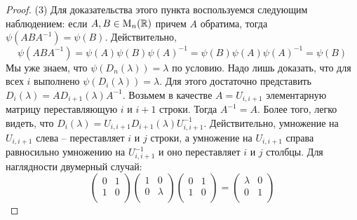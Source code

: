 \begin{proof}
(3) Для доказательства этого пункта воспользуемся следующим наблюдением: если $A,B\in\operatorname{M}_{n}(\mathbb R)$ причем $A$ обратима, тогда $\psi(ABA^{-1}) = \psi(B)$. Действительно, 
\[
\psi(ABA^{-1}) = \psi(A)\psi(B)\psi(A)^{-1} =  \psi(B)\psi(A)\psi(A)^{-1} = \psi(B)
\]
Мы уже знаем, что $\psi(D_n(\lambda)) = \lambda$ по условию. Надо лишь доказать, что для всех $i$ выполнено $\psi(D_i(\lambda)) = \lambda$. Для этого достаточно представить $D_{i}(\lambda) = A D_{i+1}(\lambda)A^{-1}$. Возьмем в качестве $A = U_{i, i+1}$ элементарную матрицу переставляющую $i$ и $i+1$ строки. Тогда $A^{-1} = A$. Более того, легко видеть, что $D_{i}(\lambda) = U_{i, i+1} D_{i+1}(\lambda)U_{i, i+1}^{-1}$. Действительно, умножение на $U_{i, i+1}$ слева -- переставляет $i$ и $j$ строки, а умножение на $U_{i, i+1}$ справа равносильно умножению на $U_{i, i+1}^{-1}$ и оно переставляет $i$ и $j$ столбцы. Для наглядности двумерный случай:
\[
\begin{pmatrix}
{0}&{1}\\
{1}&{0}\\
\end{pmatrix}
\begin{pmatrix}
{1}&{0}\\
{0}&{\lambda}\\
\end{pmatrix}
\begin{pmatrix}
{0}&{1}\\
{1}&{0}\\
\end{pmatrix}
=
\begin{pmatrix}
{\lambda}&{0}\\
{0}&{1}\\
\end{pmatrix}
\]


\end{proof}
